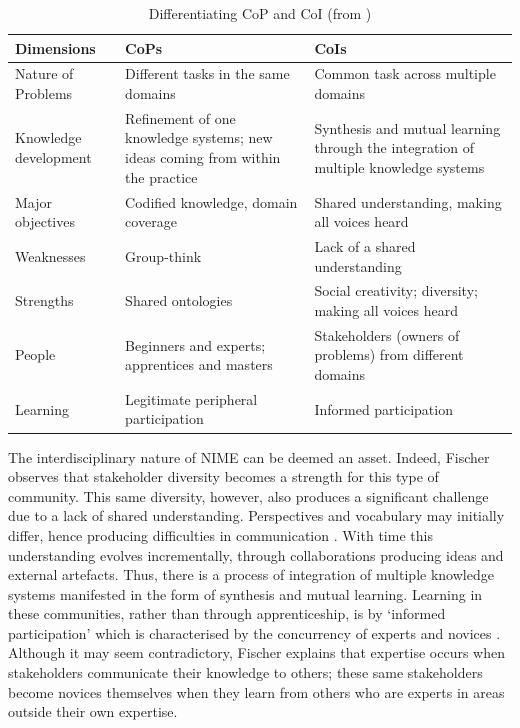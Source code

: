 \begin{table}[t]
\centering
{}
\caption{Differentiating CoP and CoI (from \cite{Fischer:2009})}
\label{Marquez-Borbon:fig:CoI}
\vspace{3pt} \noindent
\begin{tabular}{p{}p{}p{}}
\toprule
\textbf{Dimensions}     & \textbf{CoPs} & \textbf{CoIs} \\
\midrule  
Nature of Problems  	& Different tasks in the same domains 	& Common task across multiple domains \\
Knowledge development 	& Refinement of one knowledge systems; new ideas coming from within the practice & Synthesis and mutual learning through the integration of multiple knowledge systems \\
Major objectives 		& Codified knowledge, domain coverage 	& Shared understanding, making all voices heard \\ 
Weaknesses 				& Group-think 							& Lack of a shared understanding \\
Strengths				& Shared ontologies						& Social creativity; diversity; making all voices heard \\
People 					& Beginners and experts; apprentices and masters  & Stakeholders (owners of problems) from different domains \\
Learning 				& Legitimate peripheral participation 	& Informed participation \\
\bottomrule
\end{tabular}
\end{table}

%

The interdisciplinary nature of NIME can be deemed an asset. Indeed, Fischer observes that stakeholder diversity becomes a strength for this type of community. This same diversity, however, also produces a significant challenge due to a lack of shared understanding. Perspectives and vocabulary may initially differ, hence producing difficulties in communication \cite{Fischer:2009}. With time this understanding evolves incrementally, through collaborations producing ideas and external artefacts. Thus, there is a process of integration of multiple knowledge systems manifested in the form of synthesis and mutual learning. Learning in these communities, rather than through apprenticeship, is by `informed participation' which is characterised by the concurrency of experts and novices \cite{Fischer:2009}. Although it may seem contradictory, Fischer explains that expertise occurs when stakeholders communicate their knowledge to others; these same stakeholders become novices themselves when they learn from others who are experts in areas outside their own expertise.  

